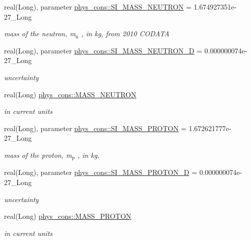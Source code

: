 \begin{DoxyCompactItemize}
real(Long), parameter \hyperlink{namespacephys__cons_ab117ad83bb79e4ed199d17f3c63ec4b3}{phys\_\-cons::SI\_\-MASS\_\-NEUTRON} = 1.674927351e-\/27\_\-Long
\begin{DoxyCompactList}\small\item\em mass of the neutron, m$_{\mbox{n}}$ , in kg, from 2010 CODATA \item\end{DoxyCompactList}\item 
real(Long), parameter \hyperlink{namespacephys__cons_af635c94d544c5bc6dcb05186a9f81d84}{phys\_\-cons::SI\_\-MASS\_\-NEUTRON\_\-D} = 0.000000074e-\/27\_\-Long
\begin{DoxyCompactList}\small\item\em uncertainty \item\end{DoxyCompactList}\item 
real(Long) \hyperlink{namespacephys__cons_abeff422917cc48601644e90ab12fb7c0}{phys\_\-cons::MASS\_\-NEUTRON}
\begin{DoxyCompactList}\small\item\em in current units \item\end{DoxyCompactList}\item 
real(Long), parameter \hyperlink{namespacephys__cons_a6a740864089f117512dc89ea53f3dc5f}{phys\_\-cons::SI\_\-MASS\_\-PROTON} = 1.672621777e-\/27\_\-Long
\begin{DoxyCompactList}\small\item\em mass of the proton, m$_{\mbox{p}}$ , in kg. \item\end{DoxyCompactList}\item 
real(Long), parameter \hyperlink{namespacephys__cons_a3c37a18a918519962cfc26597082d53d}{phys\_\-cons::SI\_\-MASS\_\-PROTON\_\-D} = 0.000000074e-\/27\_\-Long
\begin{DoxyCompactList}\small\item\em uncertainty \item\end{DoxyCompactList}\item 
real(Long) \hyperlink{namespacephys__cons_a20e8ed3d7ff389588ce024048c5ccf85}{phys\_\-cons::MASS\_\-PROTON}
\begin{DoxyCompactList}\small\item\em in current units \item\end{DoxyCompactList}\item 

\end{DoxyCompactItemize}
